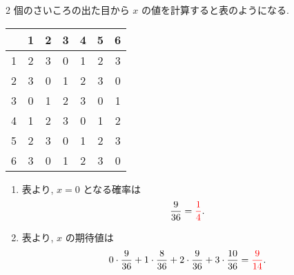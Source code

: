 2 個のさいころの出た目から $x$ の値を計算すると表のようになる.
\begin{table}[H]
	\centering
	\begin{tabular}{c|cccccc}
		  & 1 & 2 & 3 & 4 & 5 & 6 \\ \hline
		1 & 2 & 3 & 0 & 1 & 2 & 3 \\
		2 & 3 & 0 & 1 & 2 & 3 & 0 \\
		3 & 0 & 1 & 2 & 3 & 0 & 1 \\
		4 & 1 & 2 & 3 & 0 & 1 & 2 \\
		5 & 2 & 3 & 0 & 1 & 2 & 3 \\
		6 & 3 & 0 & 1 & 2 & 3 & 0
	\end{tabular}
\end{table}
\begin{enumerate}
	\item{
		表より, $x = 0$ となる確率は
		\begin{align}
			\frac{9}{36} = \textcolor{red}{\frac{1}{4}}.
		\end{align}
	}
	\item{
		表より, $x$ の期待値は
		\begin{align}
			0\cdot\frac{9}{36} + 1\cdot\frac{8}{36} + 2\cdot\frac{9}{36} + 3\cdot\frac{10}{36} = \textcolor{red}{\frac{9}{14}}.
		\end{align}
		}
\end{enumerate}
